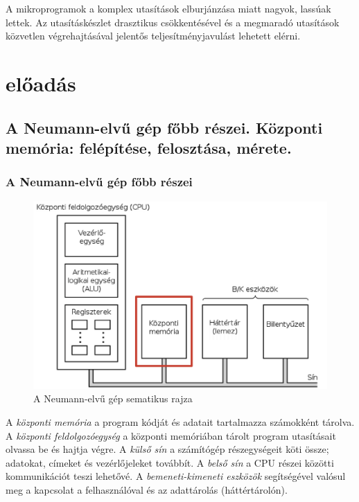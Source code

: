 \documentclass[a4paper]{article}
\begin{document}
A mikroprogramok a komplex utasítások elburjánzása miatt nagyok, lassúak lettek. Az utasításkészlet drasztikus csökkentésével és a megmaradó utasítások közvetlen végrehajtásával jelentős teljesítményjavulást lehetett elérni.

\section{előadás}

\subsection{A Neumann-elvű gép főbb részei. Központi memória: felépítése, felosztása, mérete.}

\subsubsection{A Neumann-elvű gép főbb részei}

\begin{figure}[h]
	\caption{A Neumann-elvű gép sematikus rajza}
	\label{fig:neumann}
	\includegraphics[width=\textwidth]{neumann}
\end{figure}

A \emph{központi memória} a program kódját és adatait tartalmazza számokként tárolva. A \emph{központi feldolgozóegység} a központi memóriában tárolt program utasításait olvassa be és hajtja végre. A \emph{külső sín} a számítógép részegységeit köti össze; adatokat, címeket és vezérlőjeleket továbbít. A \emph{belső sín} a CPU részei közötti kommunikációt teszi lehetővé. A \emph{bemeneti-kimeneti eszközök} segítségével valósul meg a kapcsolat a felhasználóval és az adattárolás (háttértárolón).
\end{document}
